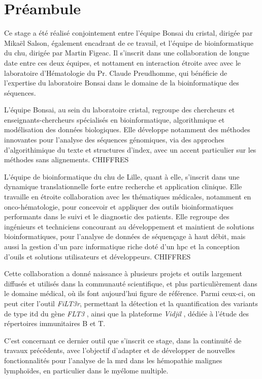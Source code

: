 \chapter{Préambule}

Ce stage a été réalisé conjointement entre l'équipe Bonsai du \gls{cristal}, 
dirigée par Mikaël Salson, également encadrant de ce travail, 
et l'équipe de bioinformatique du \gls{chu}, dirigée par Martin Figeac. 
Il s'inscrit dans une collaboration de longue date entre ces deux équipes, 
et nottament en interaction étroite avec avec le laboratoire d'Hématologie du Pr. Claude Preudhomme, 
qui bénéficie de l'expertise du laboratoire Bonsai dans le domaine de la bioinformatique 
des séquences.

\vspace{1em}

L'équipe Bonsai, au sein du laboratoire \gls{cristal}, regroupe des chercheurs et enseignants-chercheurs
spécialisés en bioinformatique, algorithmique et modélisation des données biologiques. 
Elle développe notamment des méthodes innovantes pour l'analyse des séquences génomiques, 
via des approches d'algorithimique du texte et structures d'index, avec un accent particulier 
sur les méthodes sans alignements. CHIFFRES

\vspace{1em}

L'équipe de bioinformatique du \gls{chu} de Lille, quant à elle, 
s'inscrit dans une dynamique translationnelle forte entre recherche et application clinique. 
Elle travaille en étroite collaboration avec les thématiques médicales, notamment en onco-hématologie, 
pour concevoir et appliquer des outils bioinformatiques performants dans le suivi et le diagnostic des patients.
Elle regroupe des ingénieurs et techniciens concourant au développement et maintient de solutions bioinformatiques,
pour l'analyse de données de séquençage à haut débit, mais aussi la gestion d'un parc informatique riche doté 
d'un \gls{hpc} et la conception d'ouils et solutions utilisateurs et développeurs. CHIFFRES

\vspace{1em}

Cette collaboration a donné naissance à plusieurs projets et outils 
largement diffusés et utilisés dans la communauté scientifique, 
et plus particulièrement dans le domaine médical, où ils font aujourd'hui figure de référence. 
Parmi ceux-ci, on peut citer l'outil \textit{FiLT3r}, permettant la détection 
et la quantification des variants de type \gls{itd} du gène \textit{FLT3} \cite{boudryFrugalAlignmentfreeIdentification2022}, 
ainsi que la plateforme \textit{Vidjil} \cite{duezVidjilWebPlatform2016}, dédiée à l'étude des répertoires immunitaires B et T.

\vspace{1em}

C'est concernant ce dernier outil que s'inscrit ce stage, dans la continuité de travaux précédents,
avec l'objectif d'adapter et de développer de nouvelles fonctionnalités pour l'analyse de la \gls{mrd} 
dans les hémopathie malignes lymphoïdes, en particulier dans le myélome multiple.